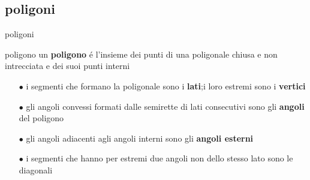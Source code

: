 \documentclass{beamer}
\begin{document}
   \subsection{poligoni}
    \begin{frame}{poligoni}
    \begin{block}{poligono}
   un \textbf{poligono} é l'insieme dei punti di una poligonale chiusa e non intrecciata e dei suoi punti interni
    \end{block}
    \begin{itemize}
        \item[$\bullet$]i segmenti che formano la poligonale sono i \textbf{lati};i loro estremi sono i \textbf{vertici}
        \item[$\bullet$]gli angoli convessi formati dalle semirette di lati consecutivi sono gli \textbf{angoli} del poligono 
        \item[$\bullet$]gli angoli adiacenti agli angoli interni sono gli \textbf{angoli esterni}
        \item[$\bullet$]i segmenti che hanno per estremi due angoli non dello stesso lato sono le diagonali 
    \end{itemize}
\end{frame}
\end{document}
